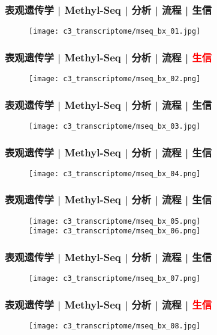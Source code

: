 \begin{frame}
  \frametitle{表观遗传学 | Methyl-Seq | 分析 | 流程 | 生信}
  \begin{figure}
    \centering
    \texttt{[image: c3\_transcriptome/mseq\_bx\_01.jpg]}
  \end{figure}
\end{frame}

\begin{frame}
  \frametitle{表观遗传学 | Methyl-Seq | 分析 | 流程 | \textcolor{red}{生信}}
  \begin{figure}
    \centering
    \texttt{[image: c3\_transcriptome/mseq\_bx\_02.png]}
  \end{figure}
\end{frame}

\begin{frame}
  \frametitle{表观遗传学 | Methyl-Seq | 分析 | 流程 | 生信}
  \begin{figure}
    \centering
    \texttt{[image: c3\_transcriptome/mseq\_bx\_03.jpg]}
  \end{figure}
\end{frame}

\begin{frame}
  \frametitle{表观遗传学 | Methyl-Seq | 分析 | 流程 | 生信}
  \begin{figure}
    \centering
    \texttt{[image: c3\_transcriptome/mseq\_bx\_04.png]}
  \end{figure}
\end{frame}

\begin{frame}
  \frametitle{表观遗传学 | Methyl-Seq | 分析 | 流程 | 生信}
  \begin{figure}
    \centering
    \texttt{[image: c3\_transcriptome/mseq\_bx\_05.png]}\\
    \texttt{[image: c3\_transcriptome/mseq\_bx\_06.png]}
  \end{figure}
\end{frame}

\begin{frame}
  \frametitle{表观遗传学 | Methyl-Seq | 分析 | 流程 | 生信}
  \begin{figure}
    \centering
    \texttt{[image: c3\_transcriptome/mseq\_bx\_07.png]}
  \end{figure}
\end{frame}

\begin{frame}
  \frametitle{表观遗传学 | Methyl-Seq | 分析 | 流程 | \textcolor{red}{生信}}
  \begin{figure}
    \centering
    \texttt{[image: c3\_transcriptome/mseq\_bx\_08.jpg]}
  \end{figure}
\end{frame}


